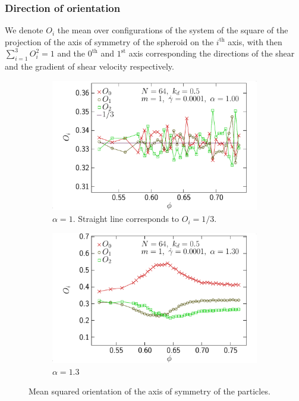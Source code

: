 \documentclass[class=report, float=false, crop=false]{standalone}
\begin{document}
\subsubsection{Direction of orientation}

We denote $O_i$ the mean over configurations of the system of the square of the projection of the axis of symmetry of the spheroid on the $i^{\text{th}}$ axis, with then $\sum_{i=1}^3 O_i^2 = 1$ and the $0^{\text{th}}$ and $1^{\text{st}}$ axis corresponding the directions of the shear and the gradient of shear velocity respectively.

\begin{figure}[h!]
\centering
    \begin{subfigure}[t]{0.49\textwidth}
        \centering
        \includegraphics[width=\textwidth]{figures/figs/ori_phi_0064_KDk500_Ml100_GDh100_EL100}
        \caption{$\alpha=1$. Straight line corresponds to $O_i=1/3$.}
        \label{ori_phi_0064_KDk500_Ml100_GDh100_EL100}
    \end{subfigure}
    \hfill
    \begin{subfigure}[t]{0.49\textwidth}
        \centering
        \includegraphics[width=\textwidth]{figures/figs/ori_phi_0064_KDk500_Ml100_GDh100_EL130}
        \caption{$\alpha=1.3$}
        \label{ori_phi_0064_KDk500_Ml100_GDh100_EL130}
    \end{subfigure}
    \caption{Mean squared orientation of the axis of symmetry of the particles.}
    \label{ori_phi_0064}
\end{figure}
\end{document}
